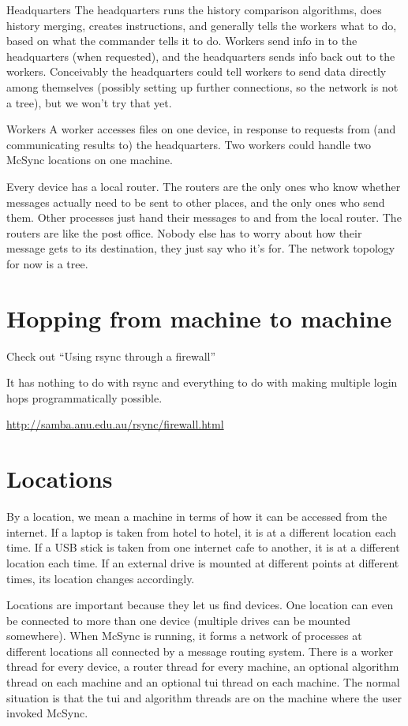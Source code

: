 \documentclass{book}
\begin{document}
Headquarters
	The headquarters runs the history comparison algorithms, does history merging, creates instructions, and generally tells the workers what to do, based on what the commander tells it to do.  Workers send info in to the headquarters (when requested), and the headquarters sends info back out to the workers.
	Conceivably the headquarters could tell workers to send data directly among themselves (possibly setting up further connections, so the network is not a tree), but we won't try that yet.

Workers
	A worker accesses files on one device, in response to requests from (and communicating results to) the headquarters.
	Two workers could handle two McSync locations on one machine.

Every device has a local router.  The routers are the only ones who know whether messages actually need to be sent to other places, and the only ones who send them.  Other processes just hand their messages to and from the local router.  The routers are like the post office.  Nobody else has to worry about how their message gets to its destination, they just say who it's for.  The network topology for now is a tree.





\section{Hopping from machine to machine}

Check out ``Using rsync through a firewall''

It has nothing to do with rsync and everything to do with making multiple login hops programmatically possible.

\url{http://samba.anu.edu.au/rsync/firewall.html}




\section{Locations}

By a location, we mean a machine in terms of how it can be accessed from the internet.  If a laptop is taken from hotel to hotel, it is at a different location each time.  If a USB stick is taken from one internet cafe to another, it is at a different location each time.  If an external drive is mounted at different points at different times, its location changes accordingly.

Locations are important because they let us find devices.  One location can even be connected to more than one device (multiple drives can be mounted somewhere).  When McSync is running, it forms a network of processes at different locations all connected by a message routing system.  There is a worker thread for every device, a router thread for every machine, an optional algorithm thread on each machine and an optional tui thread on each machine.  The normal situation is that the tui and algorithm threads are on the machine where the user invoked McSync.
\end{document}

